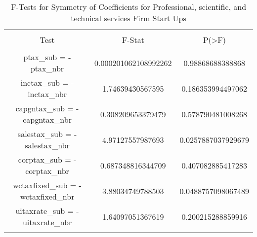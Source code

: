 
\begin{table}[!htbp] \centering 
  \caption{F-Tests for Symmetry of Coefficients for Professional, scientific, and technical services Firm Start Ups} 
  \label{} 
\begin{tabular}{@{\extracolsep{5pt}} ccc} 
\\[-1.8ex]\hline 
\hline \\[-1.8ex] 
Test & F-Stat & P(\textgreater F) \\ 
\hline \\[-1.8ex] 
ptax\_sub = -ptax\_nbr & 0.000201062108992262 & 0.98868688388868 \\ 
inctax\_sub = -inctax\_nbr & 1.74639430567595 & 0.186353994497062 \\ 
capgntax\_sub = -capgntax\_nbr & 0.308209653379479 & 0.578790481008268 \\ 
salestax\_sub = -salestax\_nbr & 4.97127557987693 & 0.0257887037929679 \\ 
corptax\_sub = -corptax\_nbr & 0.687348816344709 & 0.407082885417283 \\ 
wctaxfixed\_sub = -wctaxfixed\_nbr & 3.88034749788503 & 0.0488757098067489 \\ 
uitaxrate\_sub = -uitaxrate\_nbr & 1.64097051367619 & 0.200215288859916 \\ 
\hline \\[-1.8ex] 
\end{tabular} 
\end{table} 
